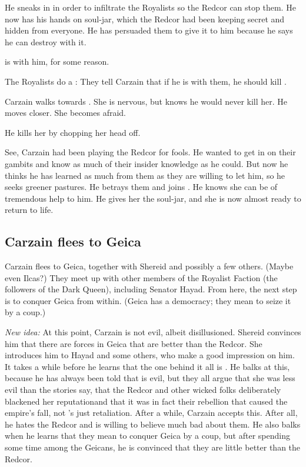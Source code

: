 He sneaks in in order to infiltrate the Royalists so the Redcor can stop them. 
He now has his hands on  soul-jar, which the Redcor had been keeping secret and hidden from everyone. 
He has persuaded them to give it to him because he says he can destroy \Belzir{} with it. 

\Racel{} is with him, for some reason. 

The Royalists do a : 
They tell Carzain that if he is with them, he should kill \Racel. 

Carzain walks towards \Racel. 
She is nervous, but knows he would never kill her.
He moves closer.
She becomes afraid.

He kills her by chopping her head off. 

See, Carzain had been playing the Redcor for fools. 
He wanted to get in on their gambits and know as much of their insider knowledge as he could. 
But now he thinks he has learned as much from them as they are willing to let him, so he seeks greener pastures. 
He betrays them and joins \Belzir. 
He knows she can be of tremendous help to him.
He gives her the soul-jar, and she is now almost ready to return to life. 







\subsection{Carzain flees to Geica} 
Carzain flees to Geica, together with Shereid and possibly a few others. 
(Maybe even Ilcas?) 
They meet up with other members of the Royalist Faction (the followers of the Dark Queen), including Senator Hayad. 
From here, the next step is to conquer Geica from within. 
(Geica has a democracy; they mean to seize it by a coup.) 

\emph{New idea:} 
At this point, Carzain is not evil, albeit disillusioned. 
Shereid convinces him that there are forces in Geica that are better than the Redcor. 
She introduces him to Hayad and some others, who make a good impression on him. 
It takes a while before he learns that the one behind it all is \Belzir. 
He balks at this, because he has always been told that \Belzir{} is evil, but they all argue that she was less evil than the stories say, that the Redcor and other wicked folks deliberately blackened her reputation\dash and that it was in fact their rebellion that caused the empire's fall, not \Belzir's just retaliation. 
After a while, Carzain accepts this. 
After all, he hates the Redcor and is willing to believe much bad about them. 
He also balks when he learns that they mean to conquer Geica by a coup, but after spending some time among the Geicans, he is convinced that they are little better than the Redcor. 







